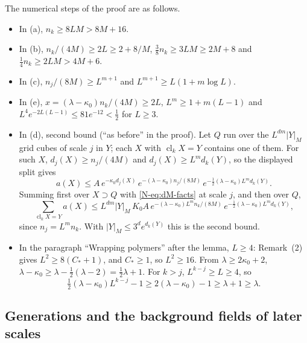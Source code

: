 \begin{detail}\label{xb:d-torus}
The numerical steps of the proof are as follows.
\begin{itemize}
\item In (a), $n_k\ge8LM>8M+16$.
\item In (b), $n_k/(4M)\ge2L\ge2+8/M$, $\frac38n_k\ge3LM\ge2M+8$ and $\frac14n_k\ge2LM>4M+6$.
\item In (c), $n_j/(8M)\ge L^{m+1}$ and $L^{m+1}\ge L(1+m\log L)$.
\item In (e), $x=(\lambda-\kappa_0)n_k/(4M)\ge2L$, $L^m\ge1+m(L-1)$ and $L^4e^{-2L(L-1)}\le81e^{-12}<\frac12$ for $L\ge3$.
\item In (d), second bound (``as before'' in the proof). Let $Q$ run over the $L^{dm}|Y|_M$ grid cubes of scale $j$ in $Y$; each $X$ with $\operatorname{cl}_kX=Y$ contains one of them. For such $X$, $d_j(X)\ge n_j/(4M)$ and $d_j(X)\ge L^md_k(Y)$, so the displayed split gives
\[
a(X)\le A\,e^{-\kappa_0d_j(X)}\,e^{-(\lambda-\kappa_0)n_j/(8M)}\,e^{-\frac12(\lambda-\kappa_0)L^md_k(Y)} .
\]
Summing first over $X\supset Q$ with \eqref{N-eq:dM-facts} at scale $j$, and then over $Q$,
\[
\sum_{\operatorname{cl}_kX=Y}a(X)\le L^{dm}|Y|_M\,K_0A\,e^{-(\lambda-\kappa_0)L^mn_k/(8M)}\,e^{-\frac12(\lambda-\kappa_0)L^md_k(Y)},
\]
since $n_j=L^mn_k$. With $|Y|_M\le3^de^{d_k(Y)}$ this is the second bound.
\item In the paragraph ``Wrapping polymers'' after the lemma, $L\ge4$: Remark~(2) gives $L^2\ge8(C_*+1)$, and $C_*\ge1$, so $L^2\ge16$. From $\lambda\ge2\kappa_0+2$, $\lambda-\kappa_0\ge\lambda-\frac12(\lambda-2)=\frac12\lambda+1$. For $k>j$, $L^{k-j}\ge L\ge4$, so
\[
\tfrac12(\lambda-\kappa_0)L^{k-j}-1\ge2(\lambda-\kappa_0)-1\ge\lambda+1\ge\lambda .
\]
\end{itemize}
\end{detail}

\subsection{Generations and the background fields of later scales}\label{xb:generations}

